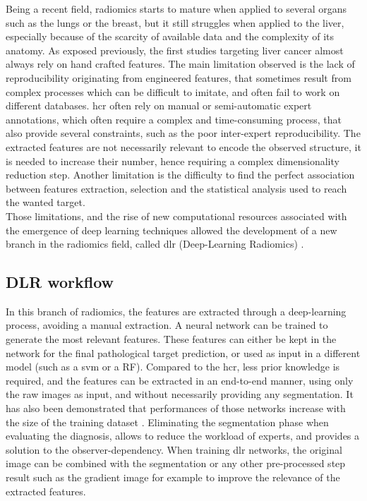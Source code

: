 Being a recent field, radiomics starts to mature when applied to several
organs such as the lungs or the breast, but it still struggles when
applied to the liver, especially because of the scarcity of available
data and the complexity of its anatomy.
As exposed previously, the first studies targeting liver cancer almost
always rely on hand crafted features.
The main limitation observed is the lack of reproducibility originating
from engineered features, that sometimes result from complex processes
which can be difficult to imitate, and often fail to work on different
databases. \ac{hcr} often rely on manual or semi-automatic expert annotations, which
often require a complex and time-consuming process, that also provide
several constraints, such as the poor inter-expert reproducibility.
The extracted features are not necessarily relevant to encode the
observed structure, it is needed to increase their number, hence
requiring a complex dimensionality reduction step.
Another limitation is the difficulty to find the perfect association
between features extraction, selection and the statistical analysis used
to reach the wanted target.\\
Those limitations, and the rise of new computational resources
associated with the emergence of deep learning techniques allowed the
development of a new branch in the radiomics field, called \ac{dlr}
(Deep-Learning Radiomics) \cite{Afshar2018}.

\subsection{DLR workflow}\label{dlr-workflow}

In this branch of radiomics, the features are extracted through a
deep-learning process, avoiding a manual extraction.
A neural network can be trained to generate the most relevant features.
These features can either be kept in the network for the final
pathological target prediction, or used as input in a different model
(such as a \ac{svm} or a RF).
Compared to the \ac{hcr}, less prior knowledge is required, and the
features can be extracted in an end-to-end manner, using only the raw
images as input, and without necessarily providing any segmentation. It
has also been demonstrated that performances of those networks increase
with the size of the training dataset \cite{Cheng2016}.
Eliminating the segmentation phase when evaluating the diagnosis, allows
to reduce the workload of experts, and provides a solution to the
observer-dependency.
When training \ac{dlr} networks, the original image can be combined
with the segmentation or any other pre-processed step result such as the
gradient image for example \cite{Sun2017a} to improve
the relevance of the extracted features.

